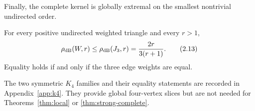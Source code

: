 Finally, the complete kernel is globally extremal on the smallest
nontrivial undirected order.

\begin{theorem}\label{thm:triangle}
For every positive undirected weighted triangle and every $r>1$,
\[
 \rho_{\mathrm{dB}}(W,r)\le\rho_{\mathrm{dB}}(J_3,r)=\frac{2r}{3(r+1)}.     \tag{2.13}\label{2.13}
\]
Equality holds if and only if the three edge weights are equal.
\end{theorem}

The two symmetric $K_4$ families and their equality statements are recorded
in Appendix~\ref{app:k4}.  They provide global four-vertex slices but are not
needed for Theorems~\ref{thm:local} or \ref{thm:strong-complete}.
